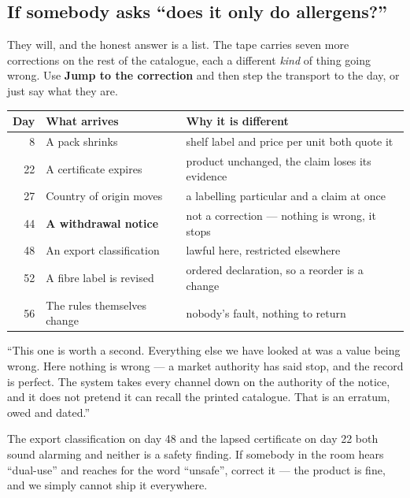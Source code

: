 \documentclass[11pt,a4paper]{article}
\newcommand{\ui}[1]{\textbf{#1}}          %
\begin{document}
\subsection{If somebody asks ``does it only do allergens?''}

They will, and the honest answer is a list. The tape carries seven more
corrections on the rest of the catalogue, each a different \emph{kind} of
thing going wrong. Use \ui{Jump to the correction} and then step the transport
to the day, or just say what they are.

\begin{center}
\begin{tabular}{@{}rll@{}}
\textbf{Day} & \textbf{What arrives} & \textbf{Why it is different} \\
\midrule
8  & A pack shrinks & shelf label and price per unit both quote it \\
22 & A certificate expires & product unchanged, the claim loses its evidence \\
27 & Country of origin moves & a labelling particular and a claim at once \\
44 & \textbf{A withdrawal notice} & not a correction --- nothing is wrong, it stops \\
48 & An export classification & lawful here, restricted elsewhere \\
52 & A fibre label is revised & ordered declaration, so a reorder is a change \\
56 & The rules themselves change & nobody's fault, nothing to return \\
\end{tabular}
\end{center}

\begin{say}
``This one is worth a second. Everything else we have looked at was a value
being wrong. Here nothing is wrong --- a market authority has said stop, and
the record is perfect. The system takes every channel down on the authority of
the notice, and it does not pretend it can recall the printed catalogue. That
is an erratum, owed and dated.''
\end{say}

\begin{careful}
The export classification on day 48 and the lapsed certificate on day 22 both
sound alarming and neither is a safety finding. If somebody in the room hears
``dual-use'' and reaches for the word ``unsafe'', correct it --- the product is
fine, and we simply cannot ship it everywhere.
\end{careful}
\end{document}
